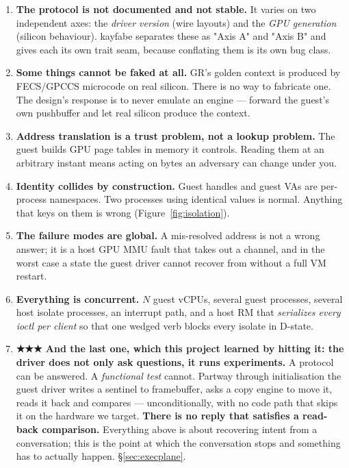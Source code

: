 \documentclass[10.5pt]{article}
\begin{document}
\begin{enumerate}[itemsep=0.4ex]
\item \textbf{The protocol is not documented and not stable.} It varies on two independent
  axes: the \emph{driver version} (wire layouts) and the \emph{GPU generation} (silicon
  behaviour). kayfabe separates these as "Axis A" and "Axis B" and gives each its own trait
  seam, because conflating them is its own bug class.
\item \textbf{Some things cannot be faked at all.} GR's golden context is produced by
  FECS/GPCCS microcode on real silicon. There is no way to fabricate one. The design's response
  is to never emulate an engine — forward the guest's own pushbuffer and let real silicon
  produce the context.
\item \textbf{Address translation is a trust problem, not a lookup problem.} The guest builds
  GPU page tables in memory it controls. Reading them at an arbitrary instant means acting on
  bytes an adversary can change under you.
\item \textbf{Identity collides by construction.} Guest handles and guest VAs are per-process
  namespaces. Two processes using identical values is normal. Anything that keys on them is
  wrong (Figure~\ref{fig:isolation}).
\item \textbf{The failure modes are global.} A mis-resolved address is not a wrong answer; it
  is a host GPU MMU fault that takes out a channel, and in the worst case a state the guest
  driver cannot recover from without a full VM restart.
\item \textbf{Everything is concurrent.} $N$ guest vCPUs, several guest processes, several host
  isolate processes, an interrupt path, and a host RM that \emph{serializes every ioctl per
  client} so that one wedged verb blocks every isolate in D-state.
\item \textbf{★★★ And the last one, which this project learned by hitting it: the driver does not
  only ask questions, it runs experiments.} A protocol can be answered. A \emph{functional test}
  cannot. Partway through initialisation the guest driver writes a sentinel to framebuffer, asks
  a copy engine to move it, reads it back and compares — unconditionally, with no code path that
  skips it on the hardware we target. \textbf{There is no reply that satisfies a read-back
  comparison.} Everything above is about recovering intent from a conversation; this is the point
  at which the conversation stops and something has to actually happen. \S\ref{sec:execplane}.
\end{enumerate}
\end{document}
